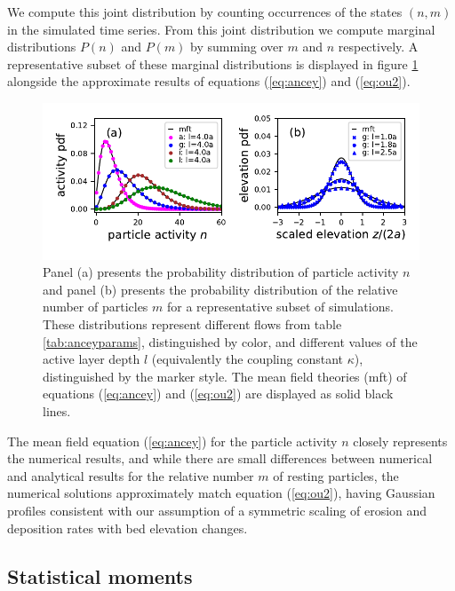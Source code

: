 We compute this joint distribution by counting occurrences of the states $(n,m)$ in the simulated time series.
From this joint distribution we compute marginal distributions $P(n)$ and $P(m)$ by summing over $m$ and $n$ respectively.
A representative subset of these marginal distributions is displayed in figure \ref{fig:pdfs} alongside the approximate results of equations (\ref{eq:ancey}) and (\ref{eq:ou2}).
\begin{figure}[!htbp]
	\includegraphics[width=\linewidth,keepaspectratio]{./figures/ch3/distributions.pdf}
	\caption{Panel (a) presents the probability distribution of particle activity $n$ and panel (b) presents the probability distribution of the relative number of particles $m$ for a representative subset of simulations. These distributions represent different flows from table \ref{tab:anceyparams}, distinguished by color, and different values of the active layer depth $l$ (equivalently the coupling constant $\kappa$), distinguished by the marker style. The mean field theories (mft) of equations (\ref{eq:ancey}) and (\ref{eq:ou2}) are displayed as solid black lines.}
	\label{fig:pdfs}
\end{figure}
The mean field equation (\ref{eq:ancey}) for the particle activity $n$ closely represents the numerical results, and while there are small differences between numerical and analytical results for the relative number $m$ of resting particles, the numerical solutions approximately match equation (\ref{eq:ou2}), having Gaussian profiles consistent with our assumption of a symmetric scaling of erosion and deposition rates with bed elevation changes. 


\subsection{Statistical moments}
\label{sec:mom}

